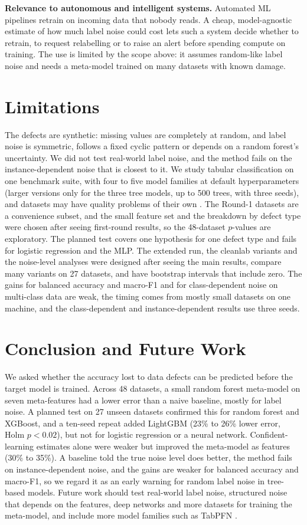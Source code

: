 \documentclass[conference]{IEEEtran}
\begin{document}
\textbf{Relevance to autonomous and intelligent systems.} Automated ML pipelines retrain on incoming data that nobody reads. A cheap, model-agnostic estimate of how much label noise could cost lets such a system decide whether to retrain, to request relabelling or to raise an alert before spending compute on training. The use is limited by the scope above: it assumes random-like label noise and needs a meta-model trained on many datasets with known damage.

\section{Limitations}\label{sec:limitations}
The defects are synthetic: missing values are completely at random, and label noise is symmetric, follows a fixed cyclic pattern or depends on a random forest's uncertainty. We did not test real-world label noise, and the method fails on the instance-dependent noise that is closest to it. We study tabular classification on one benchmark suite, with four to five model families at default hyperparameters (larger versions only for the three tree models, up to 500 trees, with three seeds), and datasets may have quality problems of their own \cite{tschalzev2025unreflected}. The Round-1 datasets are a convenience subset, and the small feature set and the breakdown by defect type were chosen after seeing first-round results, so the 48-dataset $p$-values are exploratory. The planned test covers one hypothesis for one defect type and fails for logistic regression and the MLP. The extended run, the cleanlab variants and the noise-level analyses were designed after seeing the main results, compare many variants on 27 datasets, and have bootstrap intervals that include zero. The gains for balanced accuracy and macro-F1 and for class-dependent noise on multi-class data are weak, the timing comes from mostly small datasets on one machine, and the class-dependent and instance-dependent results use three seeds.

\section{Conclusion and Future Work}\label{sec:conclusion}
We asked whether the accuracy lost to data defects can be predicted before the target model is trained. Across 48 datasets, a small random forest meta-model on seven meta-features had a lower error than a naive baseline, mostly for label noise. A planned test on 27 unseen datasets confirmed this for random forest and XGBoost, and a ten-seed repeat added LightGBM (23\% to 26\% lower error, Holm $p<0.02$), but not for logistic regression or a neural network. Confident-learning estimates alone were weaker but improved the meta-model as features (30\% to 35\%). A baseline told the true noise level does better, the method fails on instance-dependent noise, and the gains are weaker for balanced accuracy and macro-F1, so we regard it as an early warning for random label noise in tree-based models. Future work should test real-world label noise, structured noise that depends on the features, deep networks and more datasets for training the meta-model, and include more model families such as TabPFN \cite{hollmann2025tabpfn}.



\end{document}
